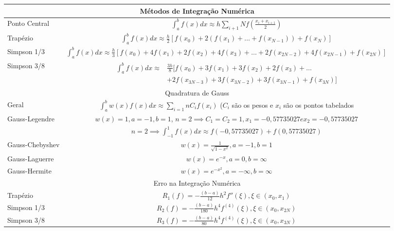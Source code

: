 \documentclass{article}
\begin{document}
\vspace{1em}
\begin{tabularx}{\textwidth}{lc}
\toprule
\multicolumn{2}{c}{Métodos de Integração Numérica}\\
\midrule
Ponto Central & $ \displaystyle \int_a^b f(x) dx \approx h \displaystyle \sum_{i+1}{N} f \left(\frac{x_i + x_{i+1}}{2} \right)$ \\
Trapézio & $ \displaystyle \int_a^b f(x)dx \approx \frac{h}{2} \left[ f(x_0) + 2\left( f(x_1) + \dots + f(x_{N-1}) \right) + f(x_N) \right] $\\

Simpson 1/3 & $ \displaystyle \int_a^b f(x)dx \approx \frac{h}{3} \left[ f(x_0) + 4f(x_1) + 2f(x_2) + 4f(x_3) + \dots + 2f(x_{2N-2}) + 4f(x_{2N-1}) + f(x_{2N}) \right] $\\

Simpson 3/8 & $ 
\begin{aligned}
\displaystyle \int_a^b f(x)dx \approx &\frac{3h}{8} [ f(x_0) + 3f(x_1) + 3f(x_2) + 2f(x_3) + \dots\\
&+ 2f(x_{3N-3}) + 3f(x_{3N-2}) + 3f(x_{3N-1}) + f(x_{3N}) ] 
\end{aligned}
$\\
\midrule
\multicolumn{2}{c}{Quadratura de Gauss}\\
\midrule
Geral & $ \displaystyle \int_a^b w(x)f(x)dx \approx \displaystyle \sum_{i=1}{n} C_if(x_i) $ ($C_i$ são os pesos e $x_i$ são os pontos tabelados \\
Gauss-Legendre & $w(x)=1, a=-1, b=1$, $n=2 \implies C_1 = C_2 = 1, x_1 =-0,57735027 e x_2 = -0,57735027$\\
& $ n=2 \implies \displaystyle \int_{-1}^1 f(x)dx \approx f(-0,57735027) + f(0,57735027) $\\
Gauss-Chebyshev & $w(x) = \frac{1}{\sqrt{1-x^2}}, a=-1, b=1$ \\
Gauss-Laguerre & $ w(x) = e^{-x}, a=0, b=\infty$\\
Gauss-Hermite & $ w(x) = e^{-x^2}, a=-\infty, b=\infty$\\
\midrule
\multicolumn{2}{c}{Erro na Integração Numérica}\\
\midrule
Trapézio & $R_1(f) = -\frac{(b-a)}{12}h^2f''(\xi), \xi \in (x_0,x_1) $\\
Simpson 1/3 & $R_2(f) = -\frac{(b-a)}{180}h^4f^{(4)}(\xi), \xi \in (x_0,x_{2N})$\\
Simpson 3/8 & $R_3(f) = -\frac{(b-a)}{80}h^4f^{(4)}(\xi), \xi \in (x_0,x_{3N})$\\
\bottomrule
\end{tabularx}\\
\end{document}
